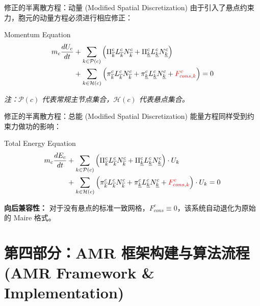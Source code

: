 \documentclass{beamer}
\begin{document}
	\begin{frame}{修正的半离散方程：动量 (Modified Spatial Discretization)}
		由于引入了悬点约束力，胞元的动量方程必须进行相应修正：
		
		\begin{block}{Momentum Equation}
			\begin{align*}
				m_c \frac{dU_c}{dt} &+ \sum_{k\in\mathcal{P}(c)} \left(\Pi_{\overline{k}}^c L_{\overline{k}}^c N_{\overline{k}}^c + \Pi_{\underline{k}}^c L_{\underline{k}}^c N_{\underline{k}}^c \right) \\
				&+ \sum_{k\in\mathcal{H}(c)} \left(\pi_{\overline{k}}^c L_{\overline{k}}^c N_{\overline{k}}^c + \pi_{\underline{k}}^c L_{\underline{k}}^c N_{\underline{k}}^c + \textcolor{red}{F_{cons,k}^c} \right) = 0
			\end{align*}
		\end{block}
		
		\textit{注：$\mathcal{P}(c)$ 代表常规主节点集合，$\mathcal{H}(c)$ 代表悬点集合。}
	\end{frame}
	
	\begin{frame}{修正的半离散方程：总能 (Modified Spatial Discretization)}
		能量方程同样受到约束力做功的影响：
		
		\begin{block}{Total Energy Equation}
			\begin{align*}
				m_c \frac{dE_c}{dt} &+ \sum_{k\in\mathcal{P}(c)} \left(\Pi_{\overline{k}}^c L_{\overline{k}}^c N_{\overline{k}}^c + \Pi_{\underline{k}}^c L_{\underline{k}}^c N_{\underline{k}}^c \right) \cdot U_k \\
				&+ \sum_{k\in\mathcal{H}(c)} \left(\pi_{\overline{k}}^c L_{\overline{k}}^c N_{\overline{k}}^c + \pi_{\underline{k}}^c L_{\underline{k}}^c N_{\underline{k}}^c + \textcolor{red}{F_{cons,k}^c} \right) \cdot U_k = 0
			\end{align*}
		\end{block}
		
		\textbf{向后兼容性：} 对于没有悬点的标准一致网格，$F_{cons}^c \equiv 0$，该系统自动退化为原始的 Maire 格式。
	\end{frame}
	
	\section{第四部分：AMR 框架构建与算法流程 (AMR Framework \& Implementation)}
	
\end{document}
